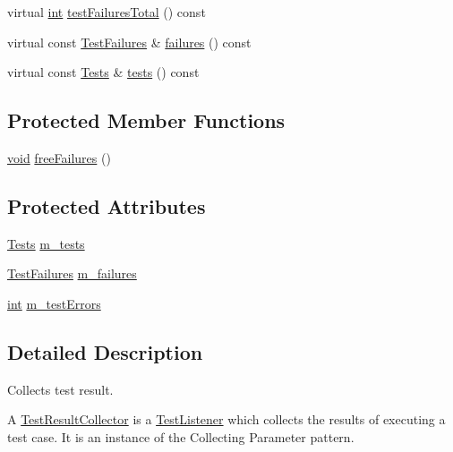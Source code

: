 \begin{DoxyCompactItemize}
\item 
virtual \hyperlink{wglew_8h_a500a82aecba06f4550f6849b8099ca21}{int} \hyperlink{class_test_result_collector_a73417ff24fff145f3575c3860d8e9340}{test\-Failures\-Total} () const 
\item 
virtual const \hyperlink{class_test_result_collector_a8ae051e883095aee10d9f777664fe8af}{Test\-Failures} \& \hyperlink{class_test_result_collector_a9c04c7276b1b19879cc3d51e9e9f33ff}{failures} () const 
\item 
virtual const \hyperlink{class_test_result_collector_a6ab73f8a52311857afa98a1ef049e30a}{Tests} \& \hyperlink{class_test_result_collector_a25890515b8eba397855a64582d3e7a9b}{tests} () const 
\end{DoxyCompactItemize}
\subsection*{Protected Member Functions}
\begin{DoxyCompactItemize}
\item 
\hyperlink{wglew_8h_aeea6e3dfae3acf232096f57d2d57f084}{void} \hyperlink{class_test_result_collector_ae3ca204ba9e242a368843e91acf94766}{free\-Failures} ()
\end{DoxyCompactItemize}
\subsection*{Protected Attributes}
\begin{DoxyCompactItemize}
\item 
\hyperlink{class_test_result_collector_a6ab73f8a52311857afa98a1ef049e30a}{Tests} \hyperlink{class_test_result_collector_a63950609cce95633b56850da67d4bfe0}{m\-\_\-tests}
\item 
\hyperlink{class_test_result_collector_a8ae051e883095aee10d9f777664fe8af}{Test\-Failures} \hyperlink{class_test_result_collector_ae2958ff17d1fd73092bf8ec4fc5db08f}{m\-\_\-failures}
\item 
\hyperlink{wglew_8h_a500a82aecba06f4550f6849b8099ca21}{int} \hyperlink{class_test_result_collector_a42fdacb6076281e8abb6eba08063fb4e}{m\-\_\-test\-Errors}
\end{DoxyCompactItemize}


\subsection{Detailed Description}
Collects test result.

A \hyperlink{class_test_result_collector}{Test\-Result\-Collector} is a \hyperlink{class_test_listener}{Test\-Listener} which collects the results of executing a test case. It is an instance of the Collecting Parameter pattern. 

